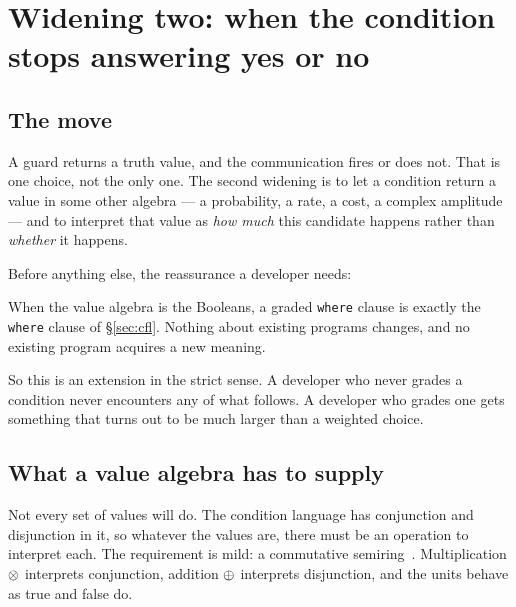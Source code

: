 \section{Widening two: when the condition stops answering yes or no}
\label{sec:graded}

\subsection{The move}

A guard returns a truth value, and the communication fires or does not. That is
one choice, not the only one. The second widening is to let a condition return a
value in some other algebra --- a probability, a rate, a cost, a complex
amplitude --- and to interpret that value as \emph{how much} this candidate
happens rather than \emph{whether} it happens.

Before anything else, the reassurance a developer needs:

\begin{proposition}[Conservativity]
\label{prop:cons}
When the value algebra is the Booleans, a graded \texttt{where} clause is
exactly the \texttt{where} clause of \S\ref{sec:cfl}. Nothing about existing
programs changes, and no existing program acquires a new meaning.
\end{proposition}

So this is an extension in the strict sense. A developer who never grades a
condition never encounters any of what follows. A developer who grades one gets
something that turns out to be much larger than a weighted choice.

\subsection{What a value algebra has to supply}

Not every set of values will do. The condition language has conjunction and
disjunction in it, so whatever the values are, there must be an operation to
interpret each. The requirement is mild: a commutative semiring~\cite{GradedWhere}. Multiplication
$\otimes$ interprets conjunction, addition $\oplus$ interprets disjunction, and
the units behave as true and false do.

